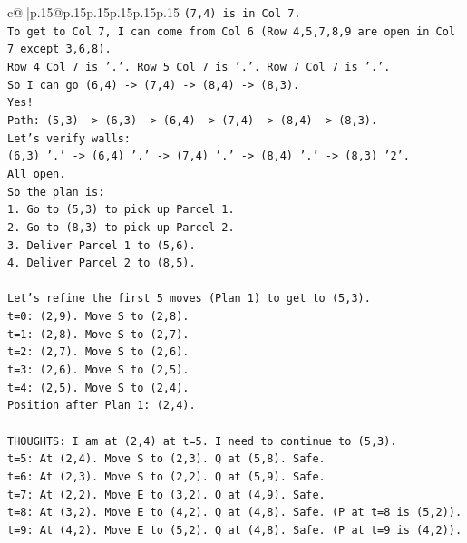 \documentclass{article}
\begin{document}
{\begin{supertabular}{c@{$\;$}|p{.15\linewidth}@{}p{.15\linewidth}p{.15\linewidth}p{.15\linewidth}p{.15\linewidth}p{.15\linewidth}}
{{{\texttt{(7,4) is in Col 7.} \\
\texttt{To get to Col 7, I can come from Col 6 (Row 4,5,7,8,9 are open in Col 7 except 3,6,8).} \\
\texttt{Row 4 Col 7 is '.'. Row 5 Col 7 is '.'. Row 7 Col 7 is '.'.} \\
\texttt{So I can go (6,4) {-}> (7,4) {-}> (8,4) {-}> (8,3).} \\
\texttt{Yes!} \\
\texttt{Path: (5,3) {-}> (6,3) {-}> (6,4) {-}> (7,4) {-}> (8,4) {-}> (8,3).} \\
\texttt{Let's verify walls:} \\
\texttt{(6,3) '.' {-}> (6,4) '.' {-}> (7,4) '.' {-}> (8,4) '.' {-}> (8,3) '2'.} \\
\texttt{All open.} \\
\texttt{So the plan is:} \\
\texttt{1. Go to (5,3) to pick up Parcel 1.} \\
\texttt{2. Go to (8,3) to pick up Parcel 2.} \\
\texttt{3. Deliver Parcel 1 to (5,6).} \\
\texttt{4. Deliver Parcel 2 to (8,5).} \\
\\ 
\texttt{Let's refine the first 5 moves (Plan 1) to get to (5,3).} \\
\texttt{t=0: (2,9). Move S to (2,8).} \\
\texttt{t=1: (2,8). Move S to (2,7).} \\
\texttt{t=2: (2,7). Move S to (2,6).} \\
\texttt{t=3: (2,6). Move S to (2,5).} \\
\texttt{t=4: (2,5). Move S to (2,4).} \\
\texttt{Position after Plan 1: (2,4).} \\
\\ 
\texttt{THOUGHTS: I am at (2,4) at t=5. I need to continue to (5,3).} \\
\texttt{t=5: At (2,4). Move S to (2,3). Q at (5,8). Safe.} \\
\texttt{t=6: At (2,3). Move S to (2,2). Q at (5,9). Safe.} \\
\texttt{t=7: At (2,2). Move E to (3,2). Q at (4,9). Safe.} \\
\texttt{t=8: At (3,2). Move E to (4,2). Q at (4,8). Safe. (P at t=8 is (5,2)).} \\
\texttt{t=9: At (4,2). Move E to (5,2). Q at (4,8). Safe. (P at t=9 is (4,2)).} \\
}}}
\end{supertabular}}
\end{document}
